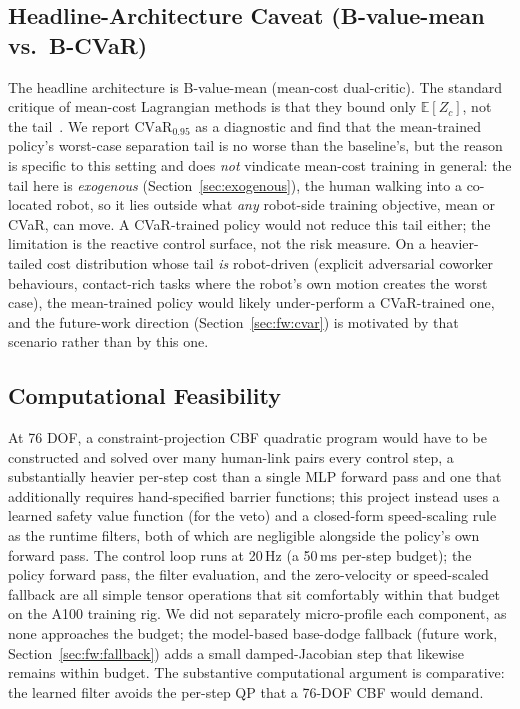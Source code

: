 \documentclass[11pt,a4paper]{report}
\newcommand{\cvar}{\ensuremath{\mathrm{CVaR}}}
\begin{document}
\subsection{Headline-Architecture Caveat (B-value-mean vs.\ B-CVaR)}
\label{sec:disc:arch-caveat}

The headline architecture is B-value-mean (mean-cost dual-critic).
The standard critique of mean-cost Lagrangian methods is that they
bound only $\mathbb{E}[Z_c]$, not the tail~\cite{yang2021wcsac}. We
report $\cvar_{0.95}$ as a diagnostic and find that the mean-trained
policy's worst-case separation tail is no worse than the baseline's,
but the reason is specific to this setting and does \emph{not} vindicate
mean-cost training in general: the tail here is \emph{exogenous}
(Section~\ref{sec:exogenous}), the human walking into a co-located
robot, so it lies outside what \emph{any} robot-side training
objective, mean or CVaR, can move. A CVaR-trained policy would not
reduce this tail either; the limitation is the reactive control
surface, not the risk measure. On a heavier-tailed cost distribution
whose tail \emph{is} robot-driven (explicit adversarial coworker
behaviours, contact-rich tasks where the robot's own motion creates
the worst case), the mean-trained policy would likely under-perform a
CVaR-trained one, and the future-work direction
(Section~\ref{sec:fw:cvar}) is motivated by that scenario rather than
by this one.

\subsection{Computational Feasibility}
\label{sec:disc:compute}

At 76 DOF, a constraint-projection CBF quadratic program would have to
be constructed and solved over many human-link pairs every control
step, a substantially heavier per-step cost than a single MLP forward
pass and one that additionally requires hand-specified barrier
functions; this project instead uses a learned safety value function
(for the veto) and a closed-form speed-scaling rule as the runtime
filters, both of which are negligible alongside the policy's own
forward pass. The control loop runs at 20\,Hz (a 50\,ms per-step
budget); the policy forward pass, the filter evaluation, and the
zero-velocity or speed-scaled fallback are all simple tensor
operations that sit comfortably within that budget on the A100
training rig. We did not separately micro-profile each component, as
none approaches the budget; the model-based base-dodge fallback
(future work, Section~\ref{sec:fw:fallback}) adds a small
damped-Jacobian step that likewise remains within budget. The
substantive computational argument is comparative: the learned filter
avoids the per-step QP that a 76-DOF CBF would demand.
\end{document}
